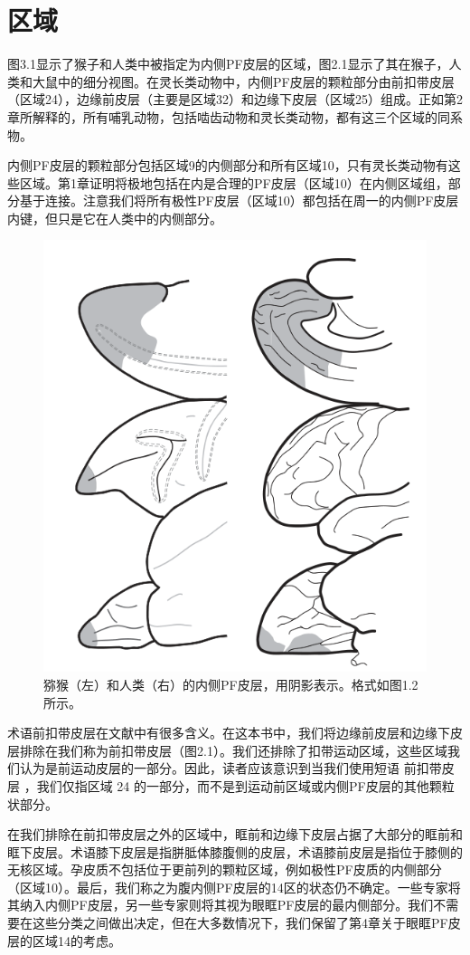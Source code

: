 \section{区域}
图3.1显示了猴子和人类中被指定为内侧PF皮层的区域，图2.1显示了其在猴子，人类和大鼠中的细分视图。在灵长类动物中，内侧PF皮层的颗粒部分由前扣带皮层（区域24），边缘前皮层（主要是区域32）和边缘下皮层（区域25）组成。正如第2章所解释的，所有哺乳动物，包括啮齿动物和灵长类动物，都有这三个区域的同系物。\par
内侧PF皮层的颗粒部分包括区域9的内侧部分和所有区域10，只有灵长类动物有这些区域。第1章证明将极地包括在内是合理的PF皮层（区域10）在内侧区域组，部分基于连接。注意我们将所有极性PF皮层（区域10）都包括在周一的内侧PF皮层内键，但只是它在人类中的内侧部分。
\begin{figure}[!htb]
	\centering
	\includegraphics{image_pfc/Fig_3_1}
	\caption{猕猴（左）和人类（右）的内侧PF皮层，用阴影表示。格式如图1.2所示。}
	\label{fig:fig}
\end{figure}

术语前扣带皮层在文献中有很多含义。在这本书中，我们将边缘前皮层和边缘下皮层排除在我们称为前扣带皮层（图2.1）。我们还排除了扣带运动区域，这些区域我们认为是前运动皮层的一部分。因此，读者应该意识到当我们使用短语 前扣带皮层 ，我们仅指区域 24 的一部分，而不是到运动前区域或内侧PF皮层的其他颗粒状部分。\par
在我们排除在前扣带皮层之外的区域中，眶前和边缘下皮层占据了大部分的眶前和眶下皮层。术语膝下皮层是指胼胝体膝腹侧的皮层，术语膝前皮层是指位于膝侧的无核区域。孕皮质不包括位于更前列的颗粒区域，例如极性PF皮质的内侧部分（区域10）。最后，我们称之为腹内侧PF皮层的14区的状态仍不确定。一些专家将其纳入内侧PF皮层，另一些专家则将其视为眼眶PF皮层的最内侧部分。我们不需要在这些分类之间做出决定，但在大多数情况下，我们保留了第4章关于眼眶PF皮层的区域14的考虑。\par
